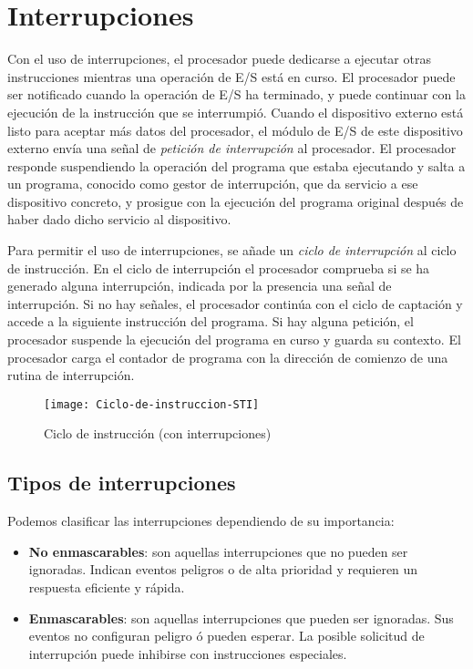 \section{Interrupciones}

Con el uso de interrupciones, el procesador puede dedicarse a ejecutar otras instrucciones mientras una operación de E/S está en curso. El procesador puede ser notificado cuando la operación de E/S ha terminado, y puede continuar con la ejecución de la instrucción que se interrumpió.
Cuando el dispositivo externo está listo para aceptar más datos del procesador, el módulo de E/S de este dispositivo externo envía una señal de \textit{petición de interrupción} al procesador. El procesador responde suspendiendo la operación del programa que estaba ejecutando y salta a un programa, conocido como gestor de interrupción, que da servicio a ese dispositivo concreto, y prosigue con la ejecución del programa original después de haber dado dicho servicio al dispositivo.

Para permitir el uso de interrupciones, se añade un \textit{ciclo de interrupción} al ciclo de instrucción. En el ciclo de interrupción el procesador comprueba si se ha generado alguna interrupción, indicada por la presencia una señal de interrupción. Si no hay señales, el procesador continúa con el ciclo de captación y accede a la siguiente instrucción del programa. Si hay alguna petición, el procesador suspende la ejecución del programa en curso y guarda su contexto. El procesador carga el contador de programa con la dirección de comienzo de una rutina de interrupción.

\begin{figure}[h]
  \centering
  \texttt{[image: Ciclo-de-instruccion-STI]}
  \caption{Ciclo de instrucción (con interrupciones)}
\end{figure}

\subsection{Tipos de interrupciones}

Podemos clasificar las interrupciones dependiendo de su importancia:

\begin{itemize}
  \item \textbf{No enmascarables}: son aquellas interrupciones que no pueden ser ignoradas. Indican eventos peligros o de alta prioridad y requieren un respuesta eficiente y rápida.
  \item \textbf{Enmascarables}: son aquellas interrupciones que pueden ser ignoradas. Sus eventos no configuran peligro ó pueden esperar. La posible solicitud de interrupción puede inhibirse con instrucciones especiales.
\end{itemize}

